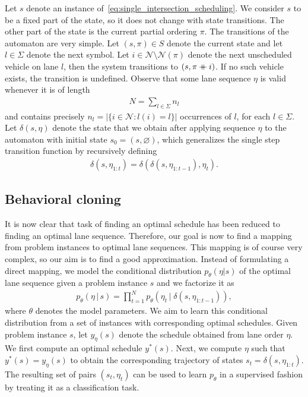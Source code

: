 \documentclass[a4paper]{article}
\newcommand\mdoubleplus{\mathbin{+\mkern-10mu+}}
\theoremstyle{definition}
\theoremstyle{plain}
\begin{document}
Let $s$ denote an instance of~\eqref{eq:single_intersection_scheduling}. We
consider $s$ to be a fixed part of the state, so it does not change with state
transitions.
The other part of the state is the current partial ordering $\pi$.
The transitions of the automaton are very simple. Let $(s, \pi) \in S$ denote
the current state and let $l \in \Sigma$ denote the next symbol. Let
$i \in \mathcal{N} \setminus \mathcal{N}(\pi)$ denote the next unscheduled vehicle on lane $l$,
then the system transitions to $(s, \pi \mdoubleplus i)$. If no such vehicle exists, the
transition is undefined. Observe that some lane sequence $\eta$ is valid
whenever it is of length
\begin{align*}
  N = \sum_{l \in \Sigma} n_{l}
\end{align*}
and contains precisely $n_l = |\{ i \in \mathcal{N} : l(i) = l \}|$ occurrences
of $l$, for each $l \in \Sigma$.
%
Let $\delta(s, \eta)$ denote the state
that we obtain after applying sequence $\eta$ to the automaton with initial
state $s_{0} = (s, \varnothing)$, which generalizes the single step transition function by
recursively defining
\begin{align*}
  \delta(s, \eta_{1:t}) = \delta(\delta(s, \eta_{1:t-1}), \eta_{t}) .
\end{align*}


\subsection*{Behavioral cloning}

It is now clear that task of finding an optimal schedule has been reduced to
finding an optimal lane sequence.
%
Therefore, our goal is now to find a mapping from problem instances to optimal lane sequences.
This mapping is of course very complex, so our aim is to find a good approximation.
%
Instead of formulating a direct mapping, we model the conditional distribution
$p_{\theta}(\eta | s)$ of the optimal lane sequence given a problem instance $s$
and we factorize it as
%
\begin{align*}
  p_{\theta} (\eta \, | \, s) = \prod_{t=1}^{N} p_{\theta}(\eta_{t} \, | \; \delta(s, \eta_{1:t-1})) ,
\end{align*}
%
where $\theta$ denotes the model parameters. We aim to learn this conditional
distribution from a set of instances with corresponding optimal schedules.
%
Given problem instance $s$, let $y_{\eta}(s)$ denote the schedule obtained from
lane order $\eta$. We first compute an optimal schedule $y^{*}(s)$. Next, we
compute $\eta$ such that $y^{*}(s) = y_{\eta}(s)$ to obtain the corresponding
trajectory of states $s_{t} = \delta(s, \eta_{1:t})$. The resulting set of pairs
$(s_{t}, \eta_{t})$ can be used to learn $p_{\theta}$ in a supervised fashion by
treating it as a classification task.
\end{document}

